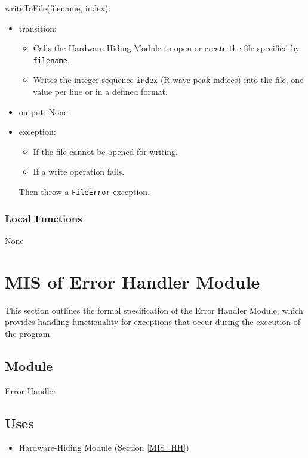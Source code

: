 \documentclass[12pt, titlepage]{article}
\begin{document}
\noindent writeToFile(filename, index):
\begin{itemize}
\item transition:
    \begin{itemize}
    \item Calls the Hardware-Hiding Module to open or create the file specified
    by \texttt{filename}.
    \item Writes the integer sequence \texttt{index} (R-wave peak indices) into
    the file, one value per line or in a defined format.
    \end{itemize}
\item output: None
\item exception:
    \begin{itemize}
    \item If the file cannot be opened for writing.
    \item If a write operation fails.
    \end{itemize}
    Then throw a \texttt{FileError} exception.
\end{itemize}

\subsubsection{Local Functions}

None

\newpage

\section{MIS of Error Handler Module} \label{MIS_ERROR}

This section outlines the formal specification of the Error Handler Module,
which provides handling functionality for exceptions that occur during the
execution of the program.

\subsection{Module}

Error Handler

\subsection{Uses}

\begin{itemize}
\item Hardware-Hiding Module (Section \ref{MIS_HH})
\end{itemize}
\end{document}
